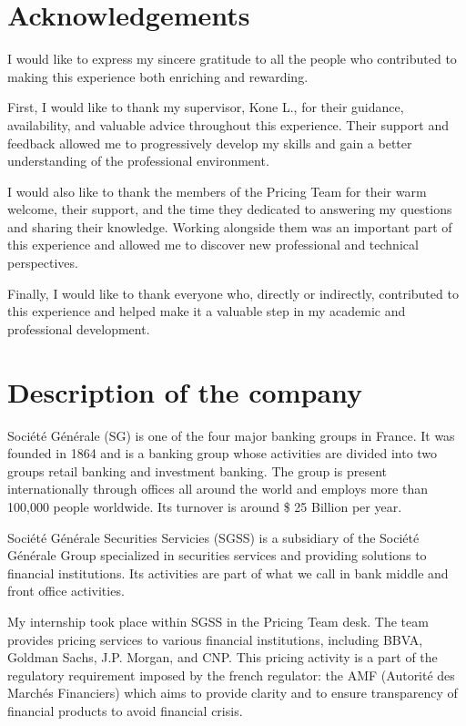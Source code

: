 \documentclass{article}
\begin{document}
\clearpage

\section*{Acknowledgements}

I would like to express my sincere gratitude to all the people who contributed to making this experience both enriching and rewarding.

First, I would like to thank my supervisor, Kone L., for their guidance, availability, and valuable advice throughout this experience. Their support and feedback allowed me to progressively develop my skills and gain a better understanding of the professional environment.

I would also like to thank the members of the Pricing Team for their warm welcome, their support, and the time they dedicated to answering my questions and sharing their knowledge. Working alongside them was an important part of this experience and allowed me to discover new professional and technical perspectives.


Finally, I would like to thank everyone who, directly or indirectly, contributed to this experience and helped make it a valuable step in my academic and professional development.
\clearpage

\section{Description of the company}

Société Générale (SG) is one of the four major banking groups in France. It was founded in 1864 and is a banking group whose activities are divided into two groups retail banking and investment banking. The group is present internationally through offices all around the world and employs more than 100,000 people worldwide. Its turnover is around \$ 25 Billion per year. 

Société Générale Securities Servicies (SGSS) is a subsidiary of the Société Générale Group specialized in securities services and providing solutions to financial institutions. Its activities are part of what we call in bank middle and front office activities.

My internship took place within SGSS in the Pricing Team desk. The team provides pricing services to various financial institutions, including BBVA, Goldman Sachs, J.P. Morgan, and CNP. This pricing activity is a part of the regulatory requirement imposed by the french regulator: the AMF (Autorité des Marchés Financiers) which aims to provide clarity and to ensure transparency of financial products to avoid financial crisis.
\end{document}
